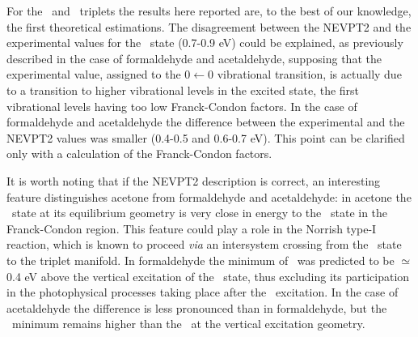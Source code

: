 For the \pipi\ and \spi\ triplets the results here reported are, to the best
of our knowledge, the first theoretical estimations.  The disagreement
between the NEVPT2 and the experimental values for the \tpipi\ state
(0.7-0.9 eV) could be explained, as previously described in the case of
formaldehyde and acetaldehyde, supposing that the experimental value,
assigned to the $0\leftarrow 0$ vibrational transition, is actually due to a
transition to higher vibrational levels in the excited state, the first
vibrational levels having too low Franck-Condon factors. In the case of
formaldehyde and acetaldehyde the difference between the experimental and
the NEVPT2 values was smaller (0.4-0.5 and 0.6-0.7 eV).  This point can be
clarified only with a calculation of the Franck-Condon factors. 

It is worth noting that if the NEVPT2 description is correct, an interesting
feature distinguishes acetone from formaldehyde and acetaldehyde: in acetone
the \tpipi\ state at its equilibrium geometry is very close in energy to the
\snpi\ state in the Franck-Condon region. This feature could play a role in
the Norrish type-I reaction, which is known to proceed {\it via} an
intersystem crossing\cite{pps-3-6-2004} from the \snpi\ state to the triplet
manifold. In formaldehyde the minimum of \tpipi\ was predicted to be
$\simeq$ 0.4 eV above the vertical excitation of the \snpi\ state, thus
excluding its participation in the photophysical processes taking place
after the \snpi\ excitation.  In the case of acetaldehyde the difference is
less pronounced than in formaldehyde, but the \tpipi\ minimum remains higher
than the \snpi\ at the vertical excitation geometry.

